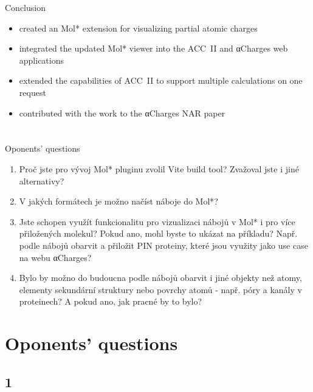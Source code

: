 \documentclass[
]{beamer}
\begin{document}
\begin{frame}{Conclusion}
  \begin{itemize}
    \item created an Mol* extension for visualizing partial atomic charges
    \item integrated the updated Mol* viewer into the ACC~II and αCharges web applications
    \item extended the capabilities of ACC~II to support multiple calculations on one request
    \item contributed with the work to the αCharges NAR paper
  \end{itemize}
\end{frame}

\section{}

\begin{frame}{Oponents' questions}
  \begin{enumerate}
    \item Proč jste pro vývoj Mol* pluginu zvolil Vite build tool? Zvažoval jste i jiné alternativy?
    \item V jakých formátech je možno načíst náboje do Mol*?
    \item Jste schopen využít funkcionalitu pro vizualizaci nábojů v Mol* i pro více přiložených molekul? Pokud ano, mohl byste to ukázat na příkladu? Např. podle nábojů obarvit a přiložit PIN proteiny, které jsou využity jako use case na webu αCharges?
    \item Bylo by možno do budoucna podle nábojů obarvit i jiné objekty než atomy, elementy sekundární struktury nebo povrchy atomů - např. póry a kanály v proteinech? A pokud ano, jak pracné by to bylo?
  \end{enumerate}
\end{frame}

\section{Oponents' questions}

\subsection[1]{1}
\end{document}
